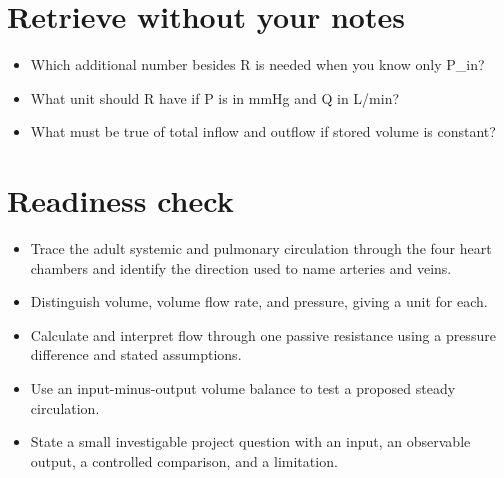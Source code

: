 \documentclass[11pt,letterpaper]{article}
\theoremstyle{definition}\newtheorem{definition}{Definition}\newtheorem{example}{Example}
\numberwithin{equation}{section}
\begin{document}
\section*{Retrieve without your notes}
\begin{itemize}
\item Which additional number besides R is needed when you know only P\_in?
\item What unit should R have if P is in mmHg and Q in L/min?
\item What must be true of total inflow and outflow if stored volume is constant?
\end{itemize}
\section*{Readiness check}
\begin{itemize}
\item Trace the adult systemic and pulmonary circulation through the four heart chambers and identify the direction used to name arteries and veins.
\item Distinguish volume, volume flow rate, and pressure, giving a unit for each.
\item Calculate and interpret flow through one passive resistance using a pressure difference and stated assumptions.
\item Use an input-minus-output volume balance to test a proposed steady circulation.
\item State a small investigable project question with an input, an observable output, a controlled comparison, and a limitation.
\end{itemize}
\end{document}
